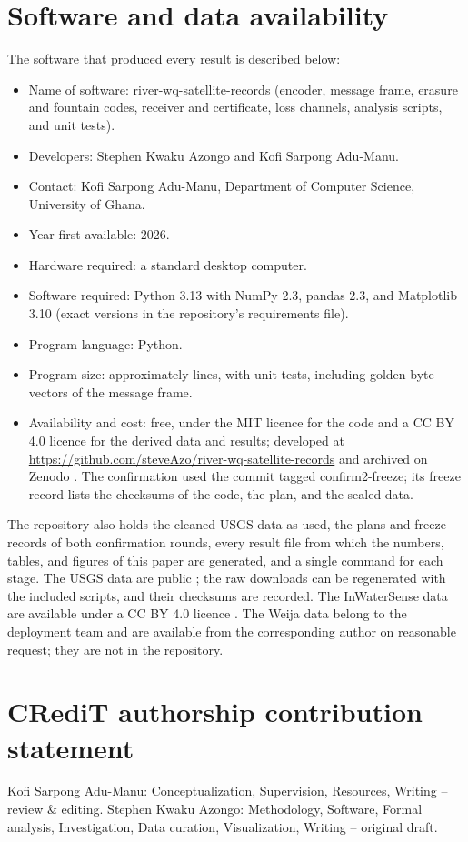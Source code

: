 \section*{Software and data availability}
The software that produced every result is described below:
\begin{itemize}
  \item Name of software: river-wq-satellite-records (encoder, message frame, erasure and fountain codes, receiver and certificate, loss channels, analysis scripts, and unit tests).
  \item Developers: Stephen Kwaku Azongo and Kofi Sarpong Adu-Manu.
  \item Contact: Kofi Sarpong Adu-Manu, Department of Computer Science, University of Ghana.
  \item Year first available: 2026.
  \item Hardware required: a standard desktop computer.
  \item Software required: Python 3.13 with NumPy 2.3, pandas 2.3, and Matplotlib 3.10 (exact versions in the repository's requirements file).
  \item Program language: Python.
  \item Program size: approximately \progLines{} lines, with \nTests{} unit tests, including golden byte vectors of the message frame.
  \item Availability and cost: free, under the MIT licence for the code and a CC BY 4.0 licence for the derived data and results; developed at \url{https://github.com/steveAzo/river-wq-satellite-records} and archived on Zenodo \citep{azongo2026code}. The confirmation used the commit tagged confirm2-freeze; its freeze record lists the checksums of the code, the plan, and the sealed data.
\end{itemize}
The repository also holds the cleaned USGS data as used, the plans and freeze records of both confirmation rounds, every result file from which the numbers, tables, and figures of this paper are generated, and a single command for each stage. The USGS data are public \citep{usgs2016nwis}; the raw downloads can be regenerated with the included scripts, and their checksums are recorded. The InWaterSense data are available under a CC BY 4.0 licence \citep{ahmedi2022data}. The Weija data belong to the deployment team and are available from the corresponding author on reasonable request; they are not in the repository.

\section*{CRediT authorship contribution statement}
Kofi Sarpong Adu-Manu: Conceptualization, Supervision, Resources, Writing -- review \& editing. Stephen Kwaku Azongo: Methodology, Software, Formal analysis, Investigation, Data curation, Visualization, Writing -- original draft.

